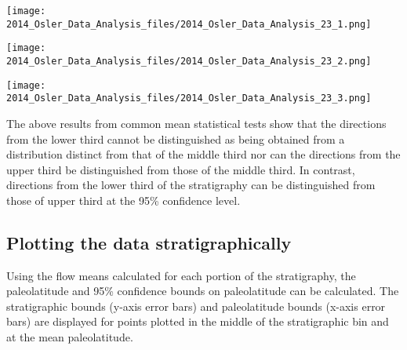 \documentclass[letterpaper,10pt,english]{/Users/polarwander/Library/Enthought/Canopy_64bit/User/lib/python2.7/site-packages/sphinx/texinputs/sphinxhowto}
\newenvironment{InvisibleVerbatim}
        {\begin{mdframed}[leftmargin=0.1\linewidth,innerleftmargin=3pt,innerrightmargin=3pt, userdefinedwidth=1\linewidth, linewidth=0pt, linecolor=white, usetwoside=false]}
        {\end{mdframed}}
\begin{document}
                \begin{InvisibleVerbatim}
                \vspace{-0.5\baselineskip}
    \begin{center}
    \texttt{[image: 2014\_Osler\_Data\_Analysis\_files/2014\_Osler\_Data\_Analysis\_23\_1.png]}
    \par
    \end{center}
    
            \end{InvisibleVerbatim}
            
                \begin{InvisibleVerbatim}
                \vspace{-0.5\baselineskip}
    \begin{center}
    \texttt{[image: 2014\_Osler\_Data\_Analysis\_files/2014\_Osler\_Data\_Analysis\_23\_2.png]}
    \par
    \end{center}
    
            \end{InvisibleVerbatim}
            
                \begin{InvisibleVerbatim}
                \vspace{-0.5\baselineskip}
    \begin{center}
    \texttt{[image: 2014\_Osler\_Data\_Analysis\_files/2014\_Osler\_Data\_Analysis\_23\_3.png]}
    \par
    \end{center}
    
            \end{InvisibleVerbatim}
            
        
    
The above results from common mean statistical tests show that the
directions from the lower third cannot be distinguished as being
obtained from a distribution distinct from that of the middle third nor
can the directions from the upper third be distinguished from those of
the middle third. In contrast, directions from the lower third of the
stratigraphy can be distinguished from those of upper third at the 95\%
confidence level.\subsection{Plotting the data stratigraphically}Using the flow means calculated for each portion of the stratigraphy,
the paleolatitude and 95\% confidence bounds on paleolatitude can be
calculated. The stratigraphic bounds (y-axis error bars) and
paleolatitude bounds (x-axis error bars) are displayed for points
plotted in the middle of the stratigraphic bin and at the mean
paleolatitude.
\end{document}
